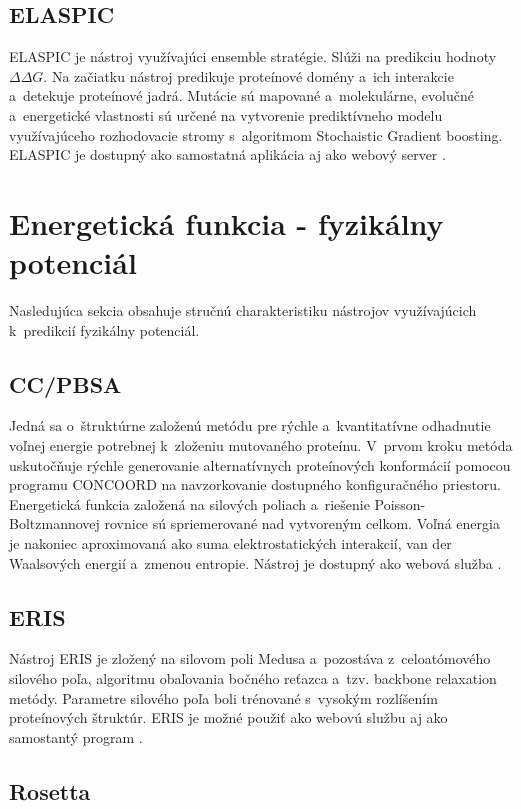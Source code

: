 \subsection{ELASPIC}

ELASPIC je nástroj využívajúci ensemble stratégie. Slúži na predikciu hodnoty $\Delta\Delta G$. Na začiatku nástroj predikuje proteínové domény a~ich interakcie a~detekuje proteínové jadrá. Mutácie sú mapované a~molekulárne, evolučné a~energetické vlastnosti sú určené na vytvorenie prediktívneho modelu využívajúceho rozhodovacie stromy s~algoritmom Stochaistic Gradient boosting. ELASPIC je dostupný ako samostatná aplikácia aj ako webový server \cite{elaspic}.

\section{Energetická funkcia - fyzikálny potenciál}

Nasledujúca sekcia obsahuje stručnú charakteristiku nástrojov využívajúcich k~predikcií fyzikálny potenciál.

\subsection{CC/PBSA}

Jedná sa o~štruktúrne založenú metódu pre rýchle a~kvantitatívne odhadnutie voľnej energie potrebnej k~zloženiu mutovaného proteínu. V~prvom kroku metóda uskutočňuje rýchle generovanie alternatívnych proteínových konformácií pomocou programu CONCOORD na navzorkovanie dostupného konfiguračného priestoru. Energetická funkcia založená na silových poliach a~riešenie Poisson-Boltzmannovej rovnice sú spriemerované nad vytvoreným celkom. Voľná energia je nakoniec aproximovaná ako suma elektrostatických interakcií, van der Waalsových energií a~zmenou entropie. Nástroj je dostupný ako webová služba \cite{ccpbsa}. 

\subsection{ERIS}

Nástroj ERIS je zložený na silovom poli Medusa a~pozostáva z~celoatómového silového poľa, algoritmu obaľovania bočného reťazca a~tzv. backbone relaxation metódy. Parametre silového poľa boli trénované s~vysokým rozlíšením proteínových štruktúr. ERIS je možné použiť ako webovú službu aj ako samostantý program \cite{eris}.

\subsection{Rosetta}

